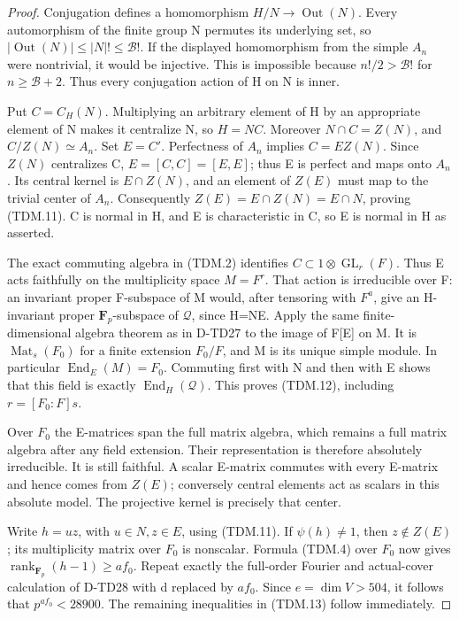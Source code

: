 \begin{proof}
Conjugation defines a homomorphism \(H/N\to\operatorname{Out}(N)\).
Every automorphism of the finite group N permutes its underlying
set, so \(|\operatorname{Out}(N)|\le|N|!\le\mathcal B!\).
If the displayed homomorphism from the simple \(A_n\) were
nontrivial, it would be injective.  This is impossible because
\(n!/2>\mathcal B!\) for \(n\ge\mathcal B+2\).
Thus every conjugation action of H on N is inner.

Put \(C=C_H(N)\).  Multiplying an arbitrary element of H by
an appropriate element of N makes it centralize N, so \(H=NC\).
Moreover \(N\cap C=Z(N)\), and \(C/Z(N)\simeq A_n\).
Set \(E=C'\).  Perfectness of \(A_n\) implies
\(C=E Z(N)\).  Since \(Z(N)\) centralizes C,
\(E=[C,C]=[E,E]\); thus E is perfect and maps onto \(A_n\).
Its central kernel is \(E\cap Z(N)\), and an element of
\(Z(E)\) must map to the trivial center of \(A_n\).
Consequently \(Z(E)=E\cap Z(N)=E\cap N\), proving (TDM.11).
C is normal in H, and E is characteristic in C, so E is normal
in H as asserted.

The exact commuting algebra in (TDM.2) identifies
\(C\subset1\otimes\operatorname{GL}_r(F)\).
Thus E acts faithfully on the multiplicity space \(M=F^r\).
That action is irreducible over F: an invariant proper F-subspace
of M would, after tensoring with \(F^a\), give an H-invariant
proper \(\mathbf F_p\)-subspace of \(\mathcal Q\), since H=NE.
Apply the same finite-dimensional algebra theorem as in D-TD27
to the image of F[E] on M.  It is
\(\operatorname{Mat}_s(F_0)\) for a finite extension \(F_0/F\),
and M is its unique simple module.  In particular
\(\operatorname{End}_E(M)=F_0\).
Commuting first with N and then with E shows that this field is
exactly \(\operatorname{End}_H(\mathcal Q)\).
This proves (TDM.12), including \(r=[F_0:F]s\).

Over \(F_0\) the E-matrices span the full matrix algebra, which
remains a full matrix algebra after any field extension.  Their
representation is therefore absolutely irreducible.  It is still
faithful.  A scalar E-matrix commutes with every E-matrix and hence
comes from \(Z(E)\); conversely central elements act as scalars
in this absolute model.  The projective kernel is precisely that
center.

Write \(h=uz\), with \(u\in N,z\in E\), using (TDM.11).
If \(\psi(h)\ne1\), then \(z\notin Z(E)\); its multiplicity matrix over \(F_0\) is
nonscalar.  Formula (TDM.4) over \(F_0\) now gives
\(\operatorname{rank}_{\mathbf F_p}(h-1)\ge a f_0\).
Repeat exactly the full-order Fourier and actual-cover calculation
of D-TD28 with d replaced by \(a f_0\).  Since \(e=\dim V>504\),
it follows that \(p^{a f_0}<28900\).  The remaining inequalities
in (TDM.13) follow immediately.
\end{proof}

